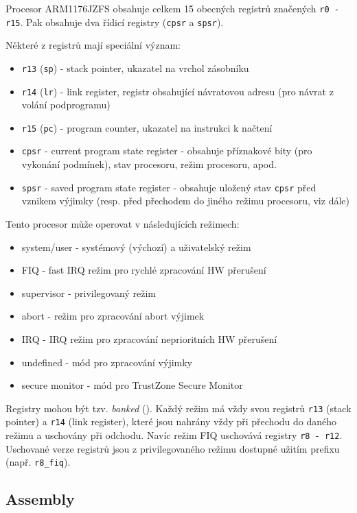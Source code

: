 \documentclass{article}
\begin{document}
Procesor ARM1176JZFS obsahuje celkem 15 obecných registrů značených \texttt{r0 - r15}. Pak obsahuje dva řídicí registry (\texttt{cpsr} a \texttt{spsr}).

Některé z registrů mají speciální význam:
\begin{itemize}
	\item \texttt{r13} (\texttt{sp}) - stack pointer, ukazatel na vrchol zásobníku
	\item \texttt{r14} (\texttt{lr}) - link register, registr obsahující návratovou adresu (pro návrat z volání podprogramu)
	\item \texttt{r15} (\texttt{pc}) - program counter, ukazatel na instrukci k načtení
	\item \texttt{cpsr} - current program state register - obsahuje příznakové bity (pro vykonání podmínek), stav procesoru, režim procesoru, apod.
	\item \texttt{spsr} - saved program state register - obsahuje uložený stav \texttt{cpsr} před vznikem výjimky (resp. před přechodem do jiného režimu procesoru, viz dále)
\end{itemize}

Tento procesor může operovat v následujících režimech:
\begin{itemize}
	\item system/user - systémový (výchozí) a uživatelský režim
	\item FIQ - fast IRQ režim pro rychlé zpracování HW přerušení
	\item supervisor - privilegovaný režim
	\item abort - režim pro zpracování abort výjimek
	\item IRQ - IRQ režim pro zpracování neprioritních HW přerušení
	\item undefined - mód pro zpracování výjimky 
	\item secure monitor - mód pro TrustZone Secure Monitor
\end{itemize}

Registry mohou být tzv. \emph{banked} (). Každý režim má vždy svou  registrů \texttt{r13} (stack pointer) a \texttt{r14} (link register), které jsou nahrány vždy při přechodu do daného režimu a uschovány při odchodu. Navíc režim FIQ uschovává registry \texttt{r8 - r12}. Uschované verze registrů jsou z privilegovaného režimu dostupné užitím prefixu (např. \texttt{r8\_fiq}).

\subsection{Assembly}
\end{document}
